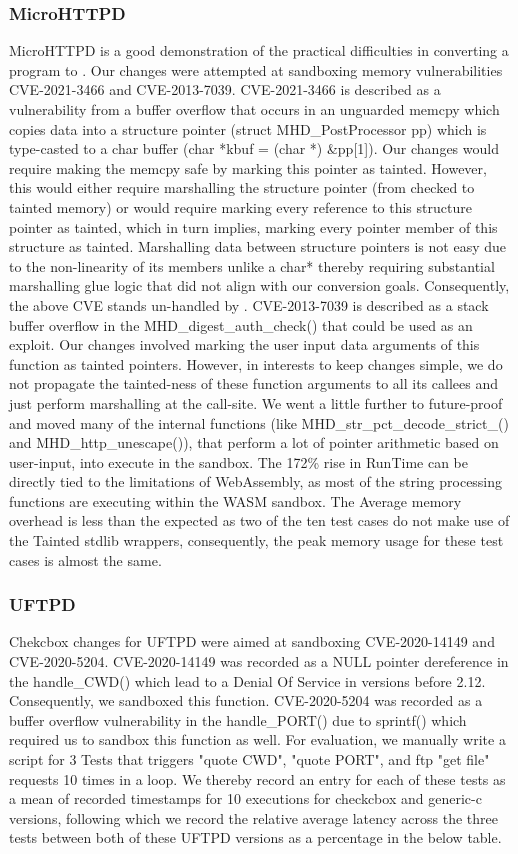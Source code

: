 \subsubsection{MicroHTTPD}
MicroHTTPD is a good demonstration of the practical difficulties in converting a program to \systemname. Our changes were attempted at sandboxing memory vulnerabilities CVE-2021-3466 and CVE-2013-7039. CVE-2021-3466 is described as a vulnerability from a buffer overflow that occurs in an unguarded memcpy which copies data into a structure pointer (struct MHD\_PostProcessor pp) which is type-casted to a char buffer (char *kbuf = (char *) \&pp[1]). Our changes would require making the memcpy safe by marking this pointer as tainted. However, this would either require marshalling the structure pointer (from checked to tainted memory) or would require marking every reference to this structure pointer as tainted, which in turn implies, marking every pointer member of this structure as tainted. Marshalling data between structure pointers is not easy due to the non-linearity of its members unlike a char* thereby requiring substantial marshalling glue logic that did not align with our conversion goals. Consequently, the above CVE stands un-handled by \systemname. CVE-2013-7039 is described as a stack buffer overflow in the MHD\_digest\_auth\_check() that could be used as an exploit. Our changes involved marking the user input data arguments of this function as tainted pointers. However, in interests to keep changes simple, we do not propagate the tainted-ness of these function arguments to all its callees and just perform marshalling at the call-site. We went a little further to future-proof and moved many of the internal functions (like MHD\_str\_pct\_decode\_strict\_() and MHD\_http\_unescape()), that perform a lot of pointer arithmetic based on user-input, into execute in the sandbox. The 172\% rise in RunTime can be directly tied to the limitations of WebAssembly, as most of the string processing functions are executing within the WASM sandbox. The Average memory overhead is less than the expected as two of the ten test cases do not make use of the Tainted stdlib wrappers, consequently, the peak memory usage for these test cases is almost the same. 

\subsubsection{UFTPD}
Chekcbox changes for UFTPD were aimed at sandboxing CVE-2020-14149 and CVE-2020-5204. CVE-2020-14149 was recorded as a NULL pointer dereference in the handle\_CWD() which lead to a Denial Of Service in versions before 2.12. Consequently, we sandboxed this function. CVE-2020-5204 was recorded as a buffer overflow vulnerability in the handle\_PORT() due to sprintf() which required us to sandbox this function as well. For evaluation, we manually write a script for 3 Tests that triggers "quote CWD", "quote PORT", and ftp "get file" requests 10 times in a loop. We thereby record an entry for each of these tests as a mean of recorded timestamps for 10 executions for checkcbox and generic-c versions, following which we record the relative average latency across the three tests between both of these UFTPD versions as a percentage in the below table.   

